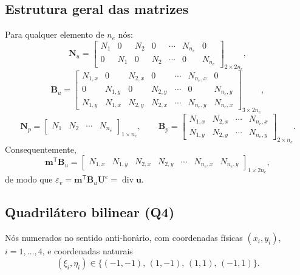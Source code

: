 \documentclass[11pt,a4paper]{article}
\numberwithin{equation}{section}
\newcommand{\Div}{\operatorname{div}}
\begin{document}
\subsection{Estrutura geral das matrizes}

Para qualquer elemento de $n_e$ nós:
\begin{equation}
\boxed{\mathbf N_u=\begin{bmatrix}
N_1&0&N_2&0&\cdots&N_{n_e}&0\\
0&N_1&0&N_2&\cdots&0&N_{n_e}
\end{bmatrix}_{2\times2n_e},}
\end{equation}
\begin{equation}
\boxed{\mathbf B_u=\begin{bmatrix}
N_{1,x}&0&N_{2,x}&0&\cdots&N_{n_e,x}&0\\
0&N_{1,y}&0&N_{2,y}&\cdots&0&N_{n_e,y}\\
N_{1,y}&N_{1,x}&N_{2,y}&N_{2,x}&\cdots&N_{n_e,y}&N_{n_e,x}
\end{bmatrix}_{3\times2n_e},}
\end{equation}
\begin{equation}
\boxed{\mathbf N_p=\begin{bmatrix}N_1&N_2&\cdots&N_{n_e}\end{bmatrix}_{1\times n_e},
\qquad
\mathbf B_p=\begin{bmatrix}
N_{1,x}&N_{2,x}&\cdots&N_{n_e,x}\\
N_{1,y}&N_{2,y}&\cdots&N_{n_e,y}
\end{bmatrix}_{2\times n_e}.}
\end{equation}
Consequentemente,
\begin{equation}
\mathbf m^{\mathsf T}\mathbf B_u=\begin{bmatrix}N_{1,x}&N_{1,y}&N_{2,x}&N_{2,y}&\cdots&N_{n_e,x}&N_{n_e,y}\end{bmatrix}_{1\times2n_e},
\end{equation}
de modo que $\varepsilon_v=\mathbf m^{\mathsf T}\mathbf B_u\mathbf U^e=\Div\mathbf u$.

\subsection{Quadrilátero bilinear (Q4)}

Nós numerados no sentido anti-horário, com coordenadas físicas
$(x_i,y_i)$, $i=1,\dots,4$, e coordenadas naturais
\begin{equation}
(\xi_i,\eta_i)\in\{(-1,-1),\,(1,-1),\,(1,1),\,(-1,1)\}.
\end{equation}
\end{document}
